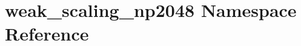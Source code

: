 \hypertarget{namespaceweak__scaling__np2048}{}\section{weak\+\_\+scaling\+\_\+np2048 Namespace Reference}
\label{namespaceweak__scaling__np2048}
